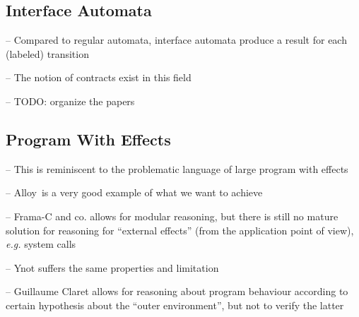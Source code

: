 \subsection{Interface Automata}

\begin{compactitem}
\item[--] Compared to regular automata, interface automata produce a result for
  each (labeled) transition
\item[--] The notion of contracts exist in this field
\item[--] TODO: organize the papers
\end{compactitem}

\subsection{Program With Effects}

\begin{compactitem}
\item[--] This is reminiscent to the problematic language of large program with
  effects
\item[--] Alloy\,\cite{jackson2012alloy} is a very good example of what we want
  to achieve
\item[--] Frama-C and co. allows for modular reasoning, but there is still no
  mature solution for reasoning for ``external effects'' (from the application
  point of view), \emph{e.g.} system calls
\item[--] Ynot suffers the same properties and limitation
\item[--] Guillaume Claret allows for reasoning about program behaviour
  according to certain hypothesis about the ``outer environment'', but not to
  verify the latter
\end{compactitem}
